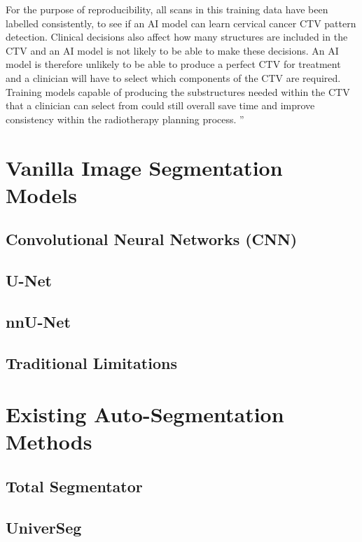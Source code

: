 \documentclass[11pt,twoside]{report}
\begin{document}
For the purpose of reproducibility, all scans in this training data have been labelled consistently, to see if an AI model can learn cervical cancer CTV pattern detection. Clinical decisions also affect how many structures are included in the CTV and an AI model is not likely to be able to make these decisions. An AI model is therefore unlikely to be able to produce a perfect CTV for treatment and a clinician will have to select which components of the CTV are required. Training models capable of producing the substructures needed within the CTV that a clinician can select from could still overall save time and improve consistency within the radiotherapy planning process.
''

\section{Vanilla Image Segmentation Models}\label{sect:vanilla-image-segmentation-models}

\subsection{Convolutional Neural Networks (CNN)}\label{sect:CNNs}

\subsection{U-Net}\label{sect:u-net}

\subsection{nnU-Net}\label{sect:nnu-net}

\subsection{Traditional Limitations}\label{sect:vanilla-limitations}

\section{Existing Auto-Segmentation Methods}\label{sect:existing-auto-segmentation-methods}

\subsection{Total Segmentator}\label{sect:totalseg}

\subsection{UniverSeg}\label{sect:universeg}
\end{document}
